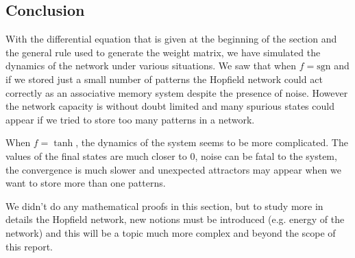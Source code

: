 \subsection{Conclusion}
With the differential equation that is given at the beginning of the
section and the general rule used to generate the weight matrix, 
we have simulated the dynamics of the network under various situations. 
We saw that when $f = \mathrm{sgn}$ and if we stored just a small number
of patterns the Hopfield network could act correctly as an associative 
memory system despite the presence of noise.
However the network capacity is without doubt limited and many spurious
states could appear if we tried to store too many patterns in a network.

When $f = \tanh$, the dynamics of the system seems to be more complicated.
The values of the final states are much closer to 0, noise can be fatal to
the system, the convergence is much slower and unexpected attractors
may appear when we want to store more than one patterns.

We didn't do any mathematical proofs in this section, but to study more
in details the Hopfield network, new notions must be introduced (e.g.
energy of the network) and this will be a topic much more complex and
beyond the scope of this report.

